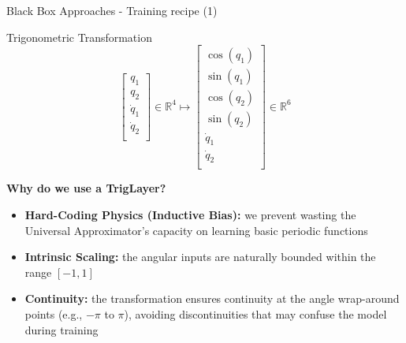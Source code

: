 
\begin{frame}{Black Box Approaches - Training recipe (1)}
    

    \begin{block}{Trigonometric Transformation}
        \[
            \begin{bmatrix}
                    q_1 \\
                    q_2 \\
                    \dot{q}_1 \\
                    \dot{q}_2 \\
            \end{bmatrix} \in \mathbb{R}^4
            \mapsto 
            \begin{bmatrix}
                \cos(q_1) \\
                \sin(q_1) \\
                \cos(q_2) \\
                \sin(q_2) \\
                \dot{q}_1 \\
                \dot{q}_2 \\
            \end{bmatrix}
            \in \mathbb{R}^6
        \]
    \end{block}

    \vspace{0.3cm}
    \textbf{Why do we use a TrigLayer?}
    
    \begin{itemize}
        \item \textbf{Hard-Coding Physics (Inductive Bias):} we prevent wasting the Universal Approximator's capacity on learning basic periodic functions
        \item \textbf{Intrinsic Scaling:} the angular inputs are naturally bounded within the range $[-1, 1]$
        \item \textbf{Continuity:} the transformation ensures continuity at the angle wrap-around points (e.g., $-\pi$ to $\pi$), avoiding discontinuities that may confuse the model during training
    \end{itemize}
    
\end{frame}

